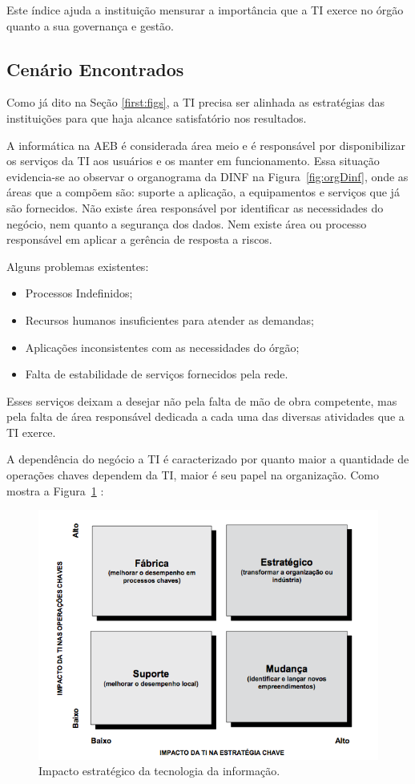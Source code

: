 Este índice ajuda a instituição mensurar a importância que a TI exerce no órgão quanto a sua governança e gestão.

\subsection{Cenário Encontrados}

Como já dito na Seção \ref{first:figs}, a TI precisa ser alinhada as estratégias das instituições para que haja alcance satisfatório nos resultados.

A informática na AEB é considerada área meio e é responsável por disponibilizar os serviços da TI aos usuários e os manter em funcionamento. Essa situação evidencia-se ao observar o organograma da DINF na Figura~\ref{fig:orgDinf}, onde as áreas que a compõem são: suporte a aplicação, a equipamentos e serviços que já são fornecidos. Não existe área responsável por identificar as necessidades do negócio, nem quanto a segurança dos dados. Nem existe área ou processo responsável em aplicar a gerência de resposta a riscos.

Alguns problemas existentes:

\begin{itemize}
\item Processos Indefinidos;
\item Recursos humanos insuficientes para atender as demandas;
\item Aplicações inconsistentes com as necessidades do órgão;
\item Falta de estabilidade de serviços fornecidos pela rede.
\end{itemize}

Esses serviços deixam a desejar não pela falta de mão de obra competente, mas pela falta de área responsável dedicada a cada uma das diversas atividades que a TI exerce. 

A dependência do negócio a TI é caracterizado por quanto maior a quantidade de operações chaves dependem da TI, maior é seu papel na organização. Como mostra a Figura~\ref{fig:impactoti} :

\begin{figure}[ht]
\centering
\includegraphics[width=.7\textwidth]{impactoTI.png}
\caption{Impacto estratégico da tecnologia da informação.}
\label{fig:impactoti}
\end{figure}

